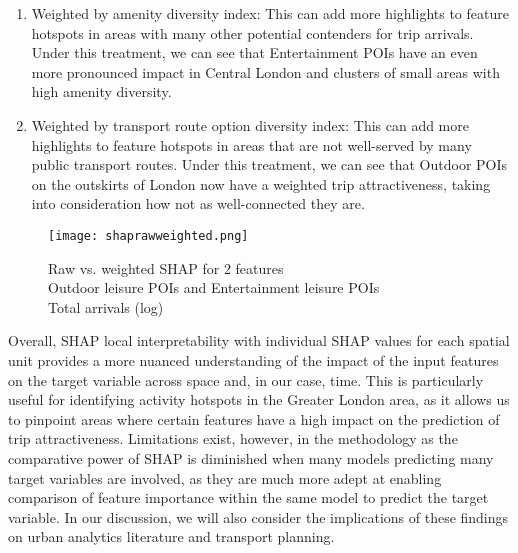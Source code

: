 \begin{enumerate}
    \setlength\itemsep{0em}
    \item Weighted by amenity diversity index: This can add more highlights to feature hotspots in areas with many other potential contenders for trip arrivals. Under this treatment, we can see that Entertainment POIs have an even more pronounced impact in Central London and clusters of small areas with high amenity diversity. 
    \item Weighted by transport route option diversity index: This can add more highlights to feature hotspots in areas that are not well-served by many public transport routes. Under this treatment, we can see that Outdoor POIs on the outskirts of London now have a weighted trip attractiveness, taking into consideration how not as well-connected they are.
\end{enumerate}

\begin{figure}[!hbt]
    \centering
    \texttt{[image: shaprawweighted.png]}
    \captionsetup{justification=centering}
    \caption{Raw vs. weighted SHAP for 2 features\\Outdoor leisure POIs and Entertainment leisure POIs \\Total arrivals (log)}
    \label{fig:shaprawweighted}
\end{figure}

Overall, SHAP local interpretability with individual SHAP values for each spatial unit provides a more nuanced understanding of the impact of the input features on the target variable across space and, in our case, time. This is particularly useful for identifying activity hotspots in the Greater London area, as it allows us to pinpoint areas where certain features have a high impact on the prediction of trip attractiveness. Limitations exist, however, in the methodology as the comparative power of SHAP is diminished when many models predicting many target variables are involved, as they are much more adept at enabling comparison of feature importance within the same model to predict the target variable. In our discussion, we will also consider the implications of these findings on urban analytics literature and transport planning.